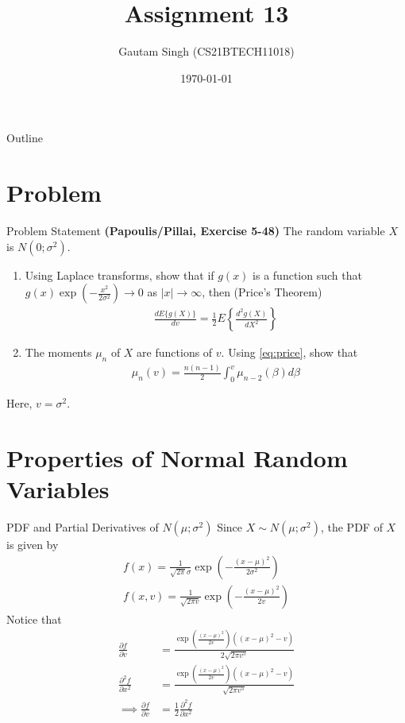 \documentclass{beamer}
\title{Assignment 13}
\author{Gautam Singh (CS21BTECH11018)}
\date{\today}
\begin{document}
\begin{frame}
    \titlepage 
\end{frame}

\begin{frame}{Outline}
    \tableofcontents
\end{frame}

\section{Problem}
\begin{frame}{Problem Statement}
	\textbf{(Papoulis/Pillai, Exercise 5-48)} The random variable $X$ is $N(0; \sigma^2)$.
	\begin{enumerate}
		\item Using Laplace transforms, show that if $g(x)$ is a function such that $g(x)\exp{(-\frac{x^2}{2\sigma^2})} \to 0$ as $|x| \to \infty$, then (Price's Theorem)
			\begin{align}
				\frac{dE\{g(X)\}}{dv} = \frac{1}{2}E\left\{\frac{d^2g(X)}{dX^2}\right\} 
				\label{eq:price}
			\end{align}
		\item The moments $\mu_n$ of $X$ are functions of $v$. Using \eqref{eq:price}, show that
			\begin{align}
				\mu_n(v) = \frac{n(n - 1)}{2}\int_{0}^{v}\mu_{n - 2}(\beta)d\beta
				\label{eq:moments}
			\end{align}
	\end{enumerate}
	Here, $v = \sigma^2$.
\end{frame}

\section{Properties of Normal Random Variables}
\begin{frame}{PDF and Partial Derivatives of $N(\mu; \sigma^2)$}
	Since $X \sim N(\mu; \sigma^2)$, the PDF of $X$ is given by
		\begin{align}
			f(x) = \frac{1}{\sqrt{2\pi}\sigma}\exp{\left(-\frac{(x - \mu)^2}{2\sigma^2}\right)} \\
			f(x, v) = \frac{1}{\sqrt{2\pi v}}\exp{\left(-\frac{(x - \mu)^2}{2v}\right)}
			\label{eq:gauss-pdf}
		\end{align}
	Notice that
		\begin{align}
			\frac{\partial f}{\partial v} &= \frac{\exp{\left(\frac{(x - \mu)^2}{2v}\right)}((x - \mu)^2 - v)}{2\sqrt{2\pi v^5}} \\
			\frac{\partial^2 f}{\partial x^2} &= \frac{\exp{\left(\frac{(x - \mu)^2}{2v}\right)}((x - \mu)^2 - v)}{\sqrt{2\pi v^5}} \\
			\implies \frac{\partial f}{\partial v} &= \frac{1}{2}\frac{\partial^2 f}{\partial x^2}
			\label{eq:gauss-derivatives}
		\end{align}
\end{frame}
		
\end{document}
